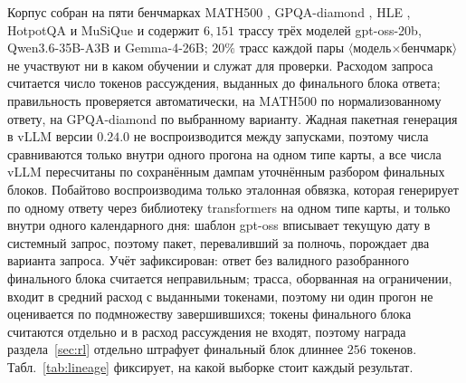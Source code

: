 \documentclass[11pt]{article}
\begin{document}
Корпус собран на пяти бенчмарках MATH500 \citep{hendrycks2021math}, GPQA-diamond \citep{rein2024gpqa}, HLE \citep{phan2025hle}, HotpotQA \citep{yang2018hotpotqa} и MuSiQue \citep{trivedi2022musique} и содержит $6{,}151$ трассу трёх моделей gpt-oss-20b, Qwen3.6-35B-A3B и Gemma-4-26B; $20\%$ трасс каждой пары $\langle$модель$\times$бенчмарк$\rangle$ не участвуют ни в каком обучении и служат для проверки. Расходом запроса считается число токенов рассуждения, выданных до финального блока ответа; правильность проверяется автоматически, на MATH500 по нормализованному ответу, на GPQA-diamond по выбранному варианту. Жадная пакетная генерация в vLLM \citep{kwon2023vllm} версии $0.24.0$ не воспроизводится между запусками, поэтому числа сравниваются только внутри одного прогона на одном типе карты, а все числа vLLM пересчитаны по сохранённым дампам уточнённым разбором финальных блоков. Побайтово воспроизводима только эталонная обвязка, которая генерирует по одному ответу через библиотеку transformers на одном типе карты, и только внутри одного календарного дня: шаблон gpt-oss вписывает текущую дату в системный запрос, поэтому пакет, переваливший за полночь, порождает два варианта запроса. Учёт зафиксирован: ответ без валидного разобранного финального блока считается неправильным; трасса, оборванная на ограничении, входит в средний расход с выданными токенами, поэтому ни один прогон не оценивается по подмножеству завершившихся; токены финального блока считаются отдельно и в расход рассуждения не входят, поэтому награда раздела~\ref{sec:rl} отдельно штрафует финальный блок длиннее $256$ токенов. Табл.~\ref{tab:lineage} фиксирует, на какой выборке стоит каждый результат.
\end{document}
